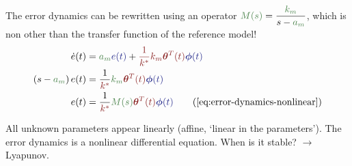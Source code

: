 The error dynamics can be rewritten using an operator
$ \knownVar{M(s)} = \dfrac{ \knownVar{k_m}}{s - \knownVar{a_m}}$,
which is non other than the transfer function of the
reference model!
\begin{alignat*}{3}
\dot{e}(t)
    &= \knownVar{a_m} \measuredVar{e(t)}
        + \unknownVar{\frac{1}{k^*} k_m \bm{\theta}^T(t)} \measuredVar{\bm{\phi}(t)} \\
\left( s - \knownVar{a_m} \right) e(t)
    &= \frac{1}{ \unknownVar{k^*}} \knownVar{k_m} \unknownVar{\bm{\theta}^T(t)} \measuredVar{\bm{\phi}(t)} \\
e(t)    &= \frac{1}{ \unknownVar{k^*}} \knownVar{M(s)} \unknownVar{\bm{\theta}^T(t)} \measuredVar{\bm{\phi}(t)}
    \tag{\ref{eq:error-dynamics-nonlinear}}
\end{alignat*}

All unknown parameters appear linearly (affine,
`linear in the parameters').
The error dynamics  is a nonlinear differential equation.
When is it stable? $ \rightarrow$ Lyapunov.


